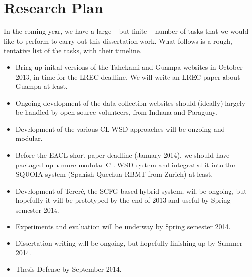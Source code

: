 \chapter{Research Plan}

In the coming year, we have a large -- but finite -- number of tasks that we
would like to perform to carry out this dissertation work. What follows is a
rough, tentative list of the tasks, with their timeline.

\begin{itemize}
  \item Bring up initial versions of the Tahekami and Guampa websites in
  October 2013, in time for the LREC deadline. We will write an LREC paper
  about Guampa at least.
  \item Ongoing development of the data-collection websites should (ideally)
  largely be handled by open-source volunteers, from Indiana and Paraguay.
  \item Development of the various CL-WSD approaches will be ongoing and
  modular.
  \item Before the EACL short-paper deadline (January 2014), we should have
  packaged up a more modular CL-WSD system and integrated it into the SQUOIA
  system (Spanish-Quechua RBMT from Zurich) at least.
  \item Development of Tereré, the SCFG-based hybrid system, will be ongoing,
  but hopefully it will be prototyped by the end of 2013 and useful by Spring
  semester 2014.
  \item Experiments and evaluation will be underway by Spring semester 2014.
  \item Dissertation writing will be ongoing, but hopefully finishing up by
  Summer 2014.
  \item Thesis Defense by September 2014.
\end{itemize}
